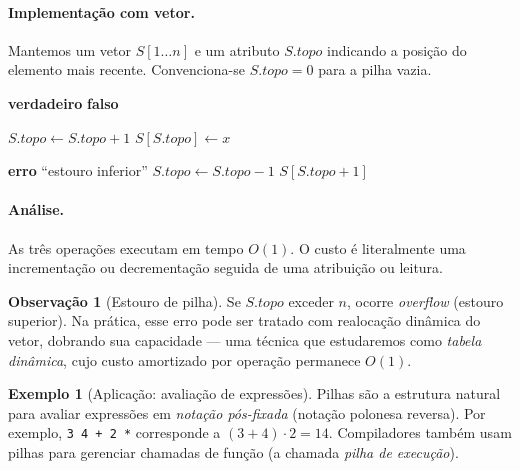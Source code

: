 \documentclass[9pt,a4paper]{extarticle}
\newcommand{\impt}[1]{\textcolor{important}{#1}}
\newcommand{\ntc}[1]{\textcolor{notice}{#1}}
\theoremstyle{definition}
\newtheorem{example}{Exemplo}[section]
\newtheorem{remark}{Observação}[section]
\begin{document}
\paragraph{Implementação com vetor.} Mantemos um vetor $S[1 \ldots n]$ e um atributo $S.\mathit{topo}$ indicando a posição do elemento mais recente. Convenciona-se $S.\mathit{topo} = 0$ para a pilha vazia.

\begin{algorithm}[H]
\caption{\textsc{Pilha-Vazia}($S$)}
\begin{algorithmic}[1]
    \State \Return \textbf{verdadeiro}
\Else
    \State \Return \textbf{falso}
\EndIf
\end{algorithmic}
\end{algorithm}

\begin{algorithm}[H]
\caption{\textsc{Empilha}($S, x$)}
\begin{algorithmic}[1]
\State $S.\mathit{topo} \gets S.\mathit{topo} + 1$
\State $S[S.\mathit{topo}] \gets x$
\end{algorithmic}
\end{algorithm}

\begin{algorithm}[H]
\caption{\textsc{Desempilha}($S$)}
\begin{algorithmic}[1]
    \State \textbf{erro} ``estouro inferior''
\Else
    \State $S.\mathit{topo} \gets S.\mathit{topo} - 1$
    \State \Return $S[S.\mathit{topo} + 1]$
\EndIf
\end{algorithmic}
\end{algorithm}

\paragraph{Análise.} As três operações executam em \impt{tempo $O(1)$}. O custo é literalmente uma incrementação ou decrementação seguida de uma atribuição ou leitura.

\begin{remark}[Estouro de pilha]
Se $S.\mathit{topo}$ exceder $n$, ocorre \emph{overflow} (estouro superior). Na prática, esse erro pode ser tratado com \ntc{realocação dinâmica} do vetor, dobrando sua capacidade — uma técnica que estudaremos como \emph{tabela dinâmica}, cujo custo amortizado por operação permanece $O(1)$.
\end{remark}

\begin{example}[Aplicação: avaliação de expressões]
Pilhas são a estrutura natural para avaliar expressões em \emph{notação pós-fixada} (notação polonesa reversa). Por exemplo, \texttt{3 4 + 2 *} corresponde a $(3+4) \cdot 2 = 14$. Compiladores também usam pilhas para gerenciar chamadas de função (a chamada \emph{pilha de execução}).
\end{example}
\end{document}
